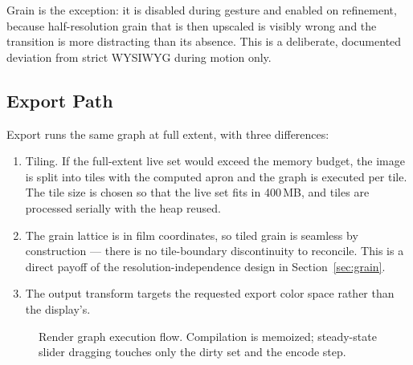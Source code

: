 Grain is the exception: it is disabled during gesture and enabled on refinement,
because half-resolution grain that is then upscaled is visibly wrong and the
transition is more distracting than its absence. This is a deliberate,
documented deviation from strict WYSIWYG during motion only.

\subsection{Export Path}

Export runs the same graph at full extent, with three differences:

\begin{enumerate}
\item Tiling. If the full-extent live set would exceed the memory budget, the
image is split into tiles with the computed apron and the graph is executed per
tile. The tile size is chosen so that the live set fits in 400\,MB, and tiles
are processed serially with the heap reused.
\item The grain lattice is in film coordinates, so tiled grain is seamless by
construction --- there is no tile-boundary discontinuity to reconcile. This is
a direct payoff of the resolution-independence design in
Section~\ref{sec:grain}.
\item The output transform targets the requested export color space rather than
the display's.
\end{enumerate}

\begin{figure}[htbp]
\centering
{}
\caption{Render graph execution flow. Compilation is memoized; steady-state slider dragging touches only the dirty set and the encode step.}
\label{fig:graphflow}
\end{figure}

